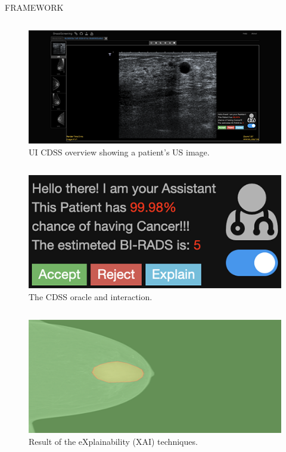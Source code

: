 \documentclass[final]{beamer}
\begin{document}
\begin{frame}[t, fragile = singleslide]{}
\begin{columns}[t]
\begin{column}{0.945\textwidth}
\begin{block}{FRAMEWORK}
\begin{column}[T]{0.33\textwidth}
\begin{figure}[!htb]
\centering
\caption{UI CDSS overview showing a patient's US image.}
\label{fig:fig002}
\includegraphics[width = 0.75\columnwidth]{./figures/fig002}
\end{figure}
\end{column}
{\color{PosterBars}\vrule width 1.5pt}
\begin{column}[T]{0.33\textwidth}
\begin{figure}[!htb]
\centering
\caption{The CDSS oracle and interaction.}
\label{fig:fig003}
\includegraphics[width = 0.75\columnwidth]{./figures/fig003}
\end{figure}
\end{column}
{\color{PosterBars}\vrule width 1.5pt}
\begin{column}[T]{0.33\textwidth}
\begin{figure}[!htb]
\centering
\caption{Result of the eXplainability (XAI) techniques.}
\label{fig:fig004}
\includegraphics[width = 0.75\columnwidth]{./figures/fig004}
\end{figure}
\end{column}


\end{block}
\end{column}
\end{columns}
\end{frame}
\end{document}
